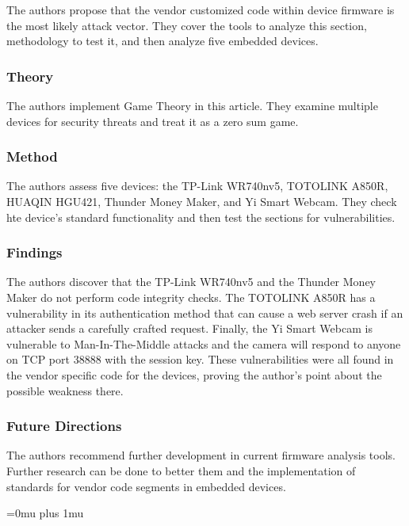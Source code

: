 \noindent
The authors propose that the vendor customized code within device firmware is the most likely attack vector.  They cover the tools to analyze this section, methodology to test it, and then analyze five embedded devices.

\subsubsection{Theory}

\noindent
The authors implement Game Theory in this article.  They examine multiple devices for security threats and treat it as a zero sum game.

\subsubsection{Method}

\noindent
The authors assess five devices: the TP-Link WR740nv5, TOTOLINK A850R, HUAQIN HGU421, Thunder Money Maker, and Yi Smart Webcam.  They check hte device's standard functionality and then test the sections for vulnerabilities.

\subsubsection{Findings}

\noindent
The authors discover that the TP-Link WR740nv5 and the Thunder Money Maker do not perform code integrity checks.  The TOTOLINK A850R has a vulnerability in its authentication method that can cause a web server crash if an attacker sends a carefully crafted request.  Finally, the Yi Smart Webcam is vulnerable to Man-In-The-Middle attacks and the camera will respond to anyone on TCP port 38888 with the session key.  These vulnerabilities were all found in the vendor specific code for the devices, proving the author's point about the possible weakness there.

\subsubsection{Future Directions}

\noindent
The authors recommend further development in current firmware analysis tools.  Further research can be done to better them and the implementation of standards for vendor code segments in embedded devices.

\Urlmuskip=0mu plus 1mu\relax
\pagebreak

